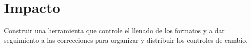 \section{Impacto}
Construir una herramienta que controle el llenado de los formatos y a dar seguimiento a las correcciones para organizar y distribuir los controles de cambio. \\